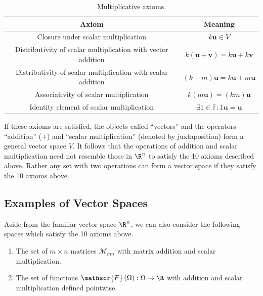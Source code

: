 \documentclass{article}
\begin{document}
\begin{table}[H]
    \centering
    \begin{tabular}{c c}
        \toprule
        \textbf{Axiom}                                               & \textbf{Meaning}                                                     \\
        \midrule
        Closure under scalar multiplication                          & \(k \symbf{u} \in V\)                                                \\
        Distributivity of scalar multiplication with vector addition & \(k \left( \symbf{u} + \symbf{v} \right) = k\symbf{u} + k\symbf{v}\) \\
        Distributivity of scalar multiplication with scalar addition & \(\left( k + m \right) \symbf{u} = k\symbf{u} + m\symbf{u}\)         \\
        Associativity of scalar multiplication                       & \(k \left( m\symbf{u} \right) = \left( k m \right) \symbf{u}\)       \\
        Identity element of scalar multiplication                    & \(\exists 1 \in \mathbb{F} : 1 \symbf{u} = \symbf{u}\)               \\
        \bottomrule
    \end{tabular}
    \caption{Multiplicative axioms.} %
\end{table}
If these axioms are satisfied, the objects called ``vectors'' and the operators ``addition'' (\(+\)) and ``scalar multiplication'' (denoted by juxtaposition) form a general vector space \(V\).
It follows that the operations of addition and scalar multiplication need not resemble those in \(\R^n\) to satisfy the 10 axioms described above.
Rather any set with two operations can form a vector space if they satisfy the 10 axioms above.
\subsection{Examples of Vector Spaces}
Aside from the familiar vector space \(\R^n\), we can also consider the
following spaces which satisfy the 10 axioms above.
\begin{enumerate}
    \item The set of \(m \times n\) matrices \(\mathscr{M}_{mn}\) with
          matrix addition and scalar multiplication.
    \item The set of functions \(\mathscr{F}\left( \Omega \right) :
          \Omega \to \R\) with addition and scalar multiplication
          defined pointwise.
\end{enumerate}
\end{document}
